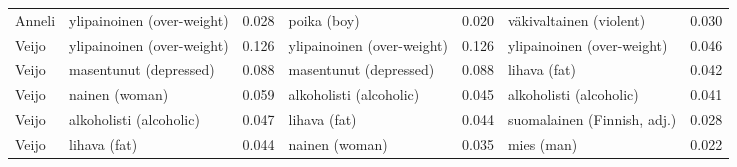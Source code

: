 \begin{longtable}{llrlrlr}
Anneli & ylipainoinen (over-weight) &                            0.028 &                poika (boy) &                                 0.020 &     väkivaltainen (violent) &                           0.030 \\
 Veijo & ylipainoinen (over-weight) &                            0.126 & ylipainoinen (over-weight) &                                 0.126 &  ylipainoinen (over-weight) &                           0.046 \\
 Veijo &     masentunut (depressed) &                            0.088 &     masentunut (depressed) &                                 0.088 &                lihava (fat) &                           0.042 \\
 Veijo &             nainen (woman) &                            0.059 &    alkoholisti (alcoholic) &                                 0.045 &     alkoholisti (alcoholic) &                           0.041 \\
 Veijo &    alkoholisti (alcoholic) &                            0.047 &               lihava (fat) &                                 0.044 & suomalainen (Finnish, adj.) &                           0.028 \\
 Veijo &               lihava (fat) &                            0.044 &             nainen (woman) &                                 0.035 &                  mies (man) &                           0.022 \\
\end{longtable}
